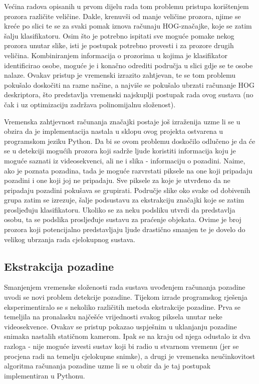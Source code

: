 \documentclass[utf8, seminar, numeric, times]{fer}
\begin{document}
Većina radova opisanih u prvom dijelu rada tom problemu pristupa korištenjem prozora različite veličine. Dakle, krenuvši od manje veličine prozora, njime se kreće po slici te se za svaki pomak iznova računaju HOG-značajke, koje se zatim šalju klasifikatoru. Osim što je potrebno ispitati sve moguće pomake nekog prozora unutar slike, isti je postupak potrebno provesti i za prozore drugih veličina. Kombiniranjem informacija o prozorima u kojima je klasifikator identificirao osobe, moguće je i konačno odrediti područja u slici gdje se te osobe nalaze. Ovakav pristup je vremenski izrazito zahtjevan, te se tom problemu pokušalo doskočiti na razne načine, a najviše se pokušalo ubrzati računanje HOG deskriptora, što predstavlja vremenski najskuplji postupak rada ovog sustava (no čak i uz optimizaciju zadržava polinomijalnu složenost).

Vremenska zahtjevnost računanja značajki postaje još izraženija uzme  li se u obzira da je implementacija nastala u sklopu ovog projekta ostvarena u programskom jeziku Python. Da bi se ovom problemu doskočilo odlučeno je da će se u detekciji mogućih prozora koji sadrže ljude koristiti informacija koju je moguće saznati iz videosekvenci, ali ne i slika - informaciju o pozadini. Naime, ako  je poznata pozadina, tada je moguće razvrstati piksele na one koji pripadaju pozadini i one koji joj ne pripadaju. Sve piksele za koje je utvrđeno da ne pripadaju pozadini pokušava se grupirati. Područje slike oko svake od dobivenih grupa zatim se izrezuje, šalje podsustavu za ekstrakciju značajki koje se zatim prosljeđuju klasifikatoru. Ukoliko se za neku podsliku utvrdi da predstavlja osobu, ta se podslika prosljeđuje sustavu za praćenje objekata. Ovime je broj prozora koji potencijalno predstavljaju ljude drastično smanjen te je dovelo do velikog ubrzanja rada cjelokupnog sustava.

\subsection{Ekstrakcija pozadine}
Smanjenjem vremenske složenosti rada sustava uvođenjem računanja pozadine uvodi se novi problem detekcije pozadine. Tijekom izrade programskog rješenja eksperimentiralo se s nekoliko različitih metoda ekstrakcije pozadine. Prva se temeljila na pronalasku najčešće vrijednosti svakog piksela unutar neke videosekvence. Ovakav se pristup pokazao uspješnim u uklanjanju pozadine snimaka nastalih statičnom kamerom. Ipak se na kraju od njega odustalo iz dva razloga - nije moguće izvesti sustav koji bi radio u stvarnom vremenu (jer se procjena radi na temelju cjelokupne snimke), a drugi je vremenska neučinkovitost algoritma računanja pozadine uzme li se u obzir da je taj postupak implementiran u Pythonu.
\end{document}
